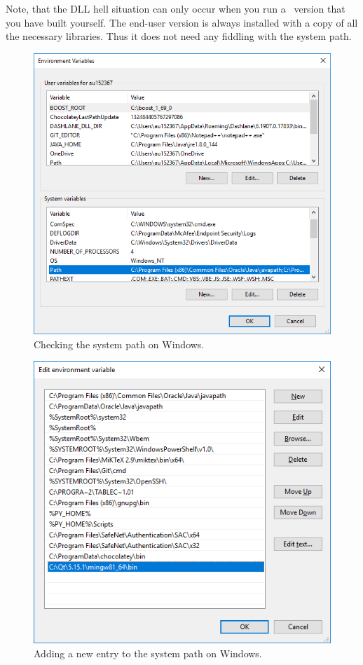 Note, that the DLL hell situation can only occur when you run a \US\ version that you have built yourself. The end-user version is always installed with a copy of all the necessary libraries. Thus it does not need any fiddling with the system path. 


\begin{figure}
\centering
\includegraphics[scale=0.8]{graphics/set-system-path-1}
\caption{Checking the system path on Windows.}
\label{fig:set-system-path-1}
\end{figure}

\begin{figure}
\centering
\includegraphics[scale=0.8]{graphics/set-system-path-2}
\caption{Adding a new entry to the system path on Windows.}
\label{fig:set-system-path-2}
\end{figure}

